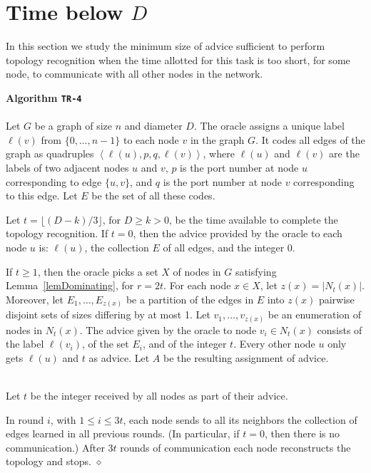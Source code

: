 \documentclass{article}
\newcommand{\algo}[1]{
\medskip
\noindent \textbf{Algorithm {\tt #1}}\\
\nopagebreak}
\newcommand{\procend}{\hfill $\diamond$\medskip}
\begin{document}
\section{Time below $D$}
In this section we study the minimum size of advice sufficient to perform topology recognition when the time allotted for this task is too short, for some node, to communicate with all other nodes in the network.



\algo{TR-4}
\\
Let $G$ be a graph of size $n$ and diameter $D$.
The oracle assigns a unique label $\ell(v)$ from $\{0,\ldots, n-1\}$ to each node $v$ in the graph $G$.
It codes all edges of the graph as quadruples $\left<\ell(u),p,q,\ell(v)\right>$, where $\ell(u)$ and $\ell(v)$ are the labels of two adjacent nodes $u$ and $v$, $p$ is the port number at node $u$ corresponding to edge $\{u,v\}$, and $q$ is the port number at node $v$ corresponding to this edge.
Let $E$ be the set of all these codes.

Let $t = \lfloor (D-k)/3\rfloor ${, for $D\ge k >0$, be the time available to complete the topology recognition}.
If $t=0$, then the advice provided by  the oracle to each node $u$ is: $\ell(u)$, the collection $E$ of all edges, and the integer $0$.


If $t\ge 1$, then the oracle picks a set $X$ of nodes in  $G$ satisfying Lemma~\ref{lemDominating}, for $r=2t$.
{For each node $x\in X$, l}et $z(x) = |N_{t}(x)|$. Moreover, let $E_1, \ldots, E_{z(x)}$ be a partition of the edges in $E$ into $z(x)$ pairwise disjoint sets of sizes differing by at most 1. 
Let $v_1, \ldots,v_{z(x)}$ be an enumeration of nodes in $N_t(x)$.
The advice given by the oracle to node $v_i\in N_t(x)$ consists of the label $\ell(v_i)$, of the set $E_i$, and of the integer $t$.
Every other node $u$ only gets $\ell(u)$ and $t$ as advice.
Let $A$ be the resulting assignment of advice.

\\
Let $t$ be the integer received by all nodes as part of their advice.

In round $i$, with $1\le i \le 3t$, each node sends to all its neighbors the collection of edges learned in all previous rounds. 
(In particular, if $t=0$, then there is no communication.)
After $3t$ rounds of communication each node reconstructs the topology and stops.
\procend
\end{document}
